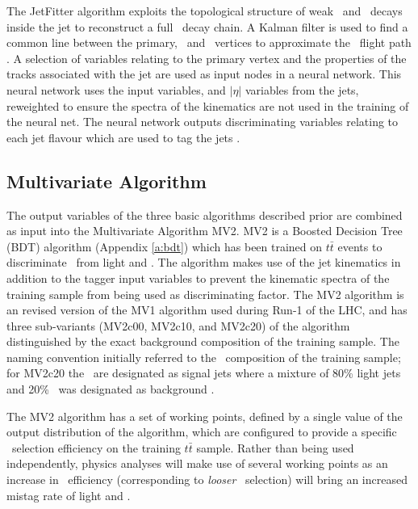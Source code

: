 		The JetFitter algorithm exploits the topological structure of weak \bhadron\ and \chadron\ decays inside the jet to reconstruct a full \bhadron\ decay chain. A Kalman filter is used to find a common line between the primary, \bhadron\ and \chadron\ vertices to approximate the \bhadron\ flight path \cite{jetfitter}. A selection of variables relating to the primary vertex and the properties of the tracks associated with the jet are used as input nodes in a neural network. This neural network uses the input variables, \pt and $|\eta|$ variables from the jets, reweighted to ensure the spectra of the kinematics are not used in the training of the neural net. The neural network outputs discriminating variables relating to each jet flavour which are used to tag the jets \cite{bTagPerformance}.

	\subsection{Multivariate Algorithm}
	\label{det:btag:mv}

	The output variables of the three basic algorithms described prior are combined as input into the Multivariate Algorithm MV2. MV2 is a Boosted Decision Tree (BDT) algorithm (Appendix \ref{a:bdt}) which has been trained on $t\bar{t}$ events to discriminate \bjets\ from light and \cjets. The algorithm makes use of the jet kinematics in addition to the tagger input variables to prevent the kinematic spectra of the training sample from being used as discriminating factor. The MV2 algorithm is an revised version of the MV1 algorithm used during Run-1 of the LHC, and has three sub-variants (MV2c00, MV2c10, and MV2c20) of the algorithm distinguished by the exact background composition of the training sample. The naming convention initially referred to the \cjet\ composition of the training sample; for MV2c20 the \bjets\ are designated as signal jets where a mixture of 80\% light jets and 20\% \cjets\ was designated as background \cite{bTagExpPerf}.

	The MV2 algorithm has a set of working points, defined by a single value of the output distribution of the algorithm, which are configured to provide a specific \bjet\ selection efficiency on the training $t\bar{t}$ sample. Rather than being used independently, physics analyses will make use of several working points as an increase in \bjet\ efficiency (corresponding to \textit{looser} \bjet\ selection) will bring an increased mistag rate of light and \cjets.

